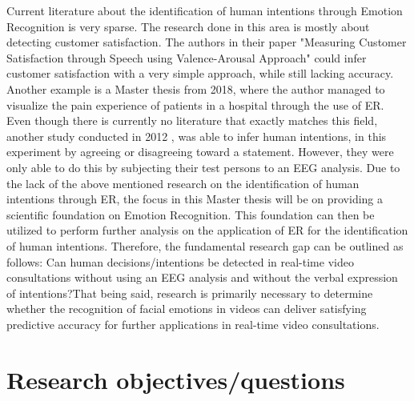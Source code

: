 \documentclass[11pt,a4paper]{scrbook}
\begin{document}
Current literature about the identification of human intentions through Emotion Recognition is very sparse. The research done in this area is mostly about detecting customer satisfaction. The authors \citet{Kamaruddin:2016:MeasuringCustomerSatisfaction} in their paper "Measuring Customer Satisfaction through Speech using Valence-Arousal Approach" could infer customer satisfaction with a very simple approach, while still lacking accuracy. Another example is a Master thesis from 2018, where the author \citet{Esser:2018:LandmarkDetection} managed to visualize the pain experience of patients in a hospital through the use of \gls{ER}. Even though there is currently no literature that exactly matches this field, another study conducted in 2012 \citep{Dong:2012:UnderstandHumanImplicitIntention}, was able to infer human intentions, in this experiment by agreeing or disagreeing toward a statement. However, they were only able to do this by subjecting their test persons to an \gls{EEG} analysis.
\newline\newline
Due to the lack of the above mentioned research on the identification of human intentions through \gls{ER}, the focus in this Master thesis will be on providing a scientific foundation on Emotion Recognition. This foundation can then be utilized to perform further analysis on the application of \gls{ER} for the identification of human intentions.
\newline\newline
Therefore, the fundamental research gap can be outlined as follows: Can human decisions/intentions be detected in real-time video consultations without using an \gls{EEG} analysis and without the verbal expression of intentions?\newline That being said, research is primarily necessary to determine whether the recognition of facial emotions in videos can deliver satisfying predictive accuracy for further applications in real-time video consultations.


\chapter{Research objectives/questions}

\end{document}
